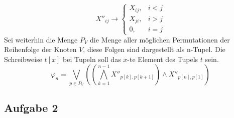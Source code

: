 \documentclass[a4paper,10pt]{article}
\begin{document}
\begin{enumerate}
$$X''_{ij} \rightarrow \begin{cases}X_{ij}, & i < j \\ X_{ji}, & i > j \\ 0, & i = j \end{cases} $$
Sei weiterhin die Menge $P_V$ die Menge aller möglichen Permutationen der Reihenfolge der Knoten $V$, diese Folgen sind dargestellt als n-Tupel. Die Schreibweise $t[x]$ bei Tupeln soll das $x$-te Element des Tupels $t$ sein.  
$$\varphi_n =  \bigvee_{p \in P_V}\left(\left(\bigwedge_{k=1}^{n-1} X''_{p[k],p[k+1]} \right) \land X''_{p[n],p[1]} \right)$$

	\end{enumerate}
	
	\subsection*{Aufgabe 2}	
\end{document}
